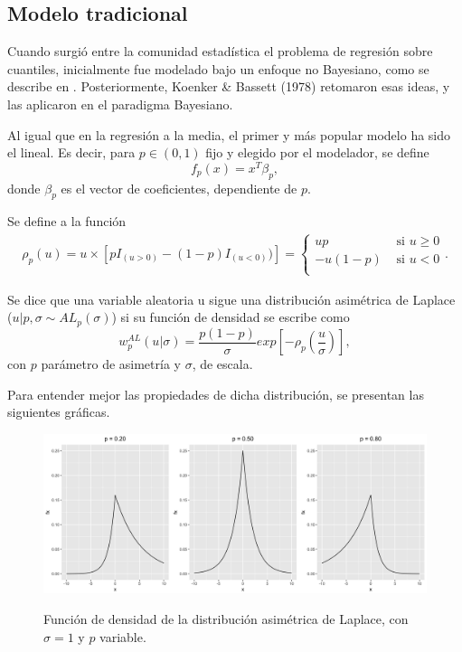 \subsection{Modelo tradicional}

Cuando surgi\'o entre la comunidad estad\'istica el problema de regresi\'on sobre cuantiles, inicialmente fue modelado bajo un enfoque no Bayesiano, como se describe en \cite{Yu_BayQuantReg}.  Posteriormente, Koenker \& Bassett (1978) retomaron esas ideas, y las aplicaron en el paradigma Bayesiano. 

Al igual que en la regresi\'on a la media, el primer y m\'as popular modelo ha sido el lineal. Es decir, para $p \in (0,1)$ fijo y elegido por el modelador, se define
\begin{equation*}
    f_p(x) = x^T\beta_p, 
\end{equation*}
donde $\beta_p$ es el vector de coeficientes, dependiente de $p$.

\begin{defin}
    Se define a la funci\'on
    \begin{equation*}
    \begin{aligned}
        \rho_p(u) = u \times [pI_{(u>0)} - (1-p) I_{(u<0)})]
        =
        \begin{cases}
            up &\text{ si } u\geq0 \\
            -u(1-p) &\text{ si } u<0 \\
        \end{cases}
        .
    \end{aligned}
    \end{equation*}

    Se dice que una variable aleatoria u sigue una distribuci\'on asim\'etrica de Laplace ($u|p,\sigma \sim AL_p(\sigma)$) si su funci\'on de densidad se escribe como
    \begin{equation*}
        w_p^{AL}(u|\sigma) = 
        \frac{p(1-p)}{\sigma}
        exp\left[
        -\rho_p
        \left(
        \frac{u}{\sigma}
        \right)
        \right],
    \end{equation*}
con $p$ par\'ametro de asimetr\'ia y $\sigma$, de escala.
\end{defin}

Para entender mejor las propiedades de dicha distribuci\'on, se presentan las siguientes gr\'aficas.
\begin{figure}[H]
	\centering
	\caption{Funci\'on de densidad de la distribuci\'on asim\'etrica de Laplace, con $\sigma = 1$ y $p$ variable.}
	\includegraphics[width=1\textwidth]{Figures/ALD/p_plots.png}
	\label{p_plots}
\end{figure}

